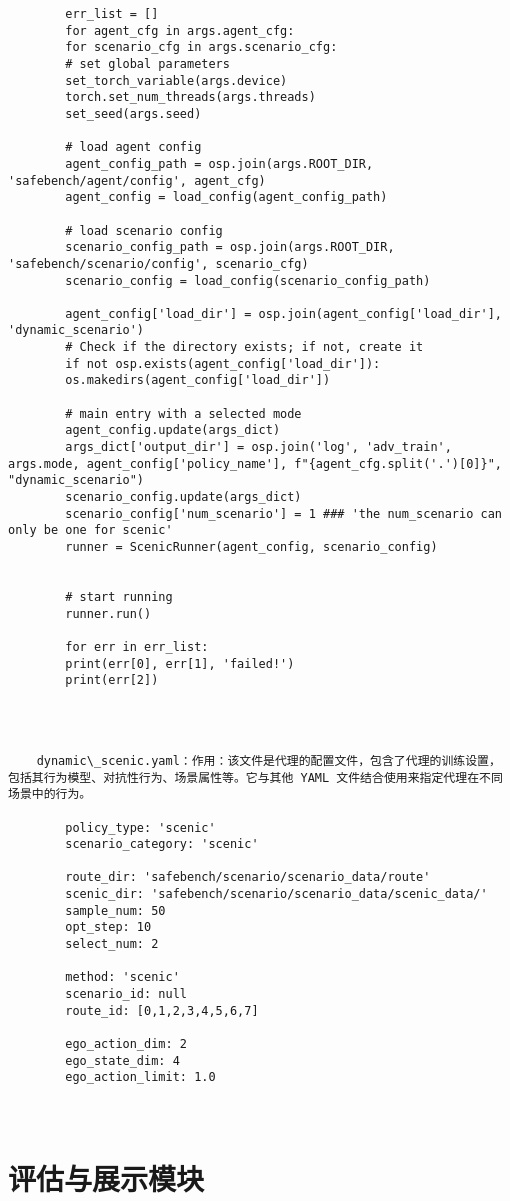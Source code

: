\begin{lstlisting}
		err_list = []
		for agent_cfg in args.agent_cfg:
		for scenario_cfg in args.scenario_cfg:
		# set global parameters
		set_torch_variable(args.device)
		torch.set_num_threads(args.threads)
		set_seed(args.seed)
		
		# load agent config
		agent_config_path = osp.join(args.ROOT_DIR, 'safebench/agent/config', agent_cfg)
		agent_config = load_config(agent_config_path)
		
		# load scenario config
		scenario_config_path = osp.join(args.ROOT_DIR, 'safebench/scenario/config', scenario_cfg)
		scenario_config = load_config(scenario_config_path)
		
		agent_config['load_dir'] = osp.join(agent_config['load_dir'], 'dynamic_scenario')
		# Check if the directory exists; if not, create it
		if not osp.exists(agent_config['load_dir']):
		os.makedirs(agent_config['load_dir'])        
		
		# main entry with a selected mode
		agent_config.update(args_dict)
		args_dict['output_dir'] = osp.join('log', 'adv_train', args.mode, agent_config['policy_name'], f"{agent_cfg.split('.')[0]}", "dynamic_scenario")
		scenario_config.update(args_dict)
		scenario_config['num_scenario'] = 1 ### 'the num_scenario can only be one for scenic'
		runner = ScenicRunner(agent_config, scenario_config)
		
		
		# start running
		runner.run()
		
		for err in err_list:
		print(err[0], err[1], 'failed!')
		print(err[2])
		
		
		
	\end{lstlisting}
\begin{lstlisting}
	dynamic\_scenic.yaml：作用：该文件是代理的配置文件，包含了代理的训练设置，包括其行为模型、对抗性行为、场景属性等。它与其他 YAML 文件结合使用来指定代理在不同场景中的行为。

		policy_type: 'scenic'
		scenario_category: 'scenic'
		
		route_dir: 'safebench/scenario/scenario_data/route'
		scenic_dir: 'safebench/scenario/scenario_data/scenic_data/'
		sample_num: 50
		opt_step: 10
		select_num: 2
		
		method: 'scenic'
		scenario_id: null
		route_id: [0,1,2,3,4,5,6,7]
		
		ego_action_dim: 2
		ego_state_dim: 4
		ego_action_limit: 1.0
		
		
\end{lstlisting}

\section*{评估与展示模块}

